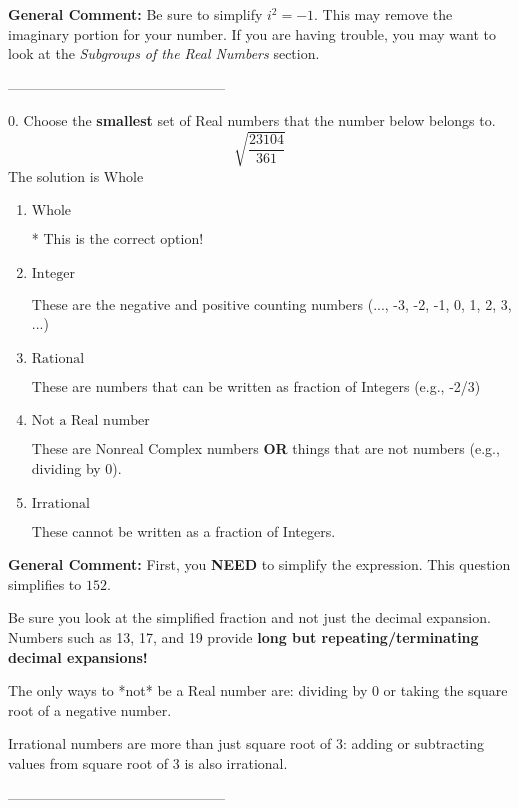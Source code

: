 \documentclass{extbook}[14pt]
\begin{document}
\textbf{General Comment:} Be sure to simplify $i^2 = -1$. This may remove the imaginary portion for your number. If you are having trouble, you may want to look at the \textit{Subgroups of the Real Numbers} section. 

-----------------------------------------------

0. Choose the \textbf{smallest} set of Real numbers that the number below belongs to.
\[ \sqrt{\frac{23104}{361}} \] 
The solution is $ \text{Whole} $ 

\begin{enumerate}[label=\Alph*.] 
\item $ \text{Whole} $ 

 * This is the correct option! 
\item $ \text{Integer} $ 

 These are the negative and positive counting numbers (..., -3, -2, -1, 0, 1, 2, 3, ...) 
\item $ \text{Rational} $ 

 These are numbers that can be written as fraction of Integers (e.g., -2/3) 
\item $ \text{Not a Real number} $ 

 These are Nonreal Complex numbers \textbf{OR} things that are not numbers (e.g., dividing by 0). 
\item $ \text{Irrational} $ 

 These cannot be written as a fraction of Integers. 
\end{enumerate} 
 
\textbf{General Comment:} First, you \textbf{NEED} to simplify the expression. This question simplifies to $152$. 
 
 Be sure you look at the simplified fraction and not just the decimal expansion. Numbers such as 13, 17, and 19 provide \textbf{long but repeating/terminating decimal expansions!} 
 
 The only ways to *not* be a Real number are: dividing by 0 or taking the square root of a negative number. 
 
 Irrational numbers are more than just square root of 3: adding or subtracting values from square root of 3 is also irrational. 

-----------------------------------------------
\end{document}
